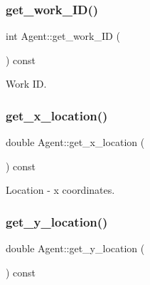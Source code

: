 \mbox{\label{classAgent_a893d27a0906f9578c54fac02c8937e44}} 
\subsubsection{\texorpdfstring{get\+\_\+work\+\_\+\+I\+D()}{get\_work\_ID()}}
{\footnotesize\ttfamily int Agent\+::get\+\_\+work\+\_\+\+ID (\begin{DoxyParamCaption}{ }\end{DoxyParamCaption}) const\hspace{0.3cm}{\ttfamily [inline]}}



Work ID. 

\mbox{\label{classAgent_aa304e2bd2e7a9564bad10c52b16cef09}} 
\subsubsection{\texorpdfstring{get\+\_\+x\+\_\+location()}{get\_x\_location()}}
{\footnotesize\ttfamily double Agent\+::get\+\_\+x\+\_\+location (\begin{DoxyParamCaption}{ }\end{DoxyParamCaption}) const\hspace{0.3cm}{\ttfamily [inline]}}



Location -\/ x coordinates. 

\mbox{\label{classAgent_a6be70e1995c222467a192a90ed9ab7dd}} 
\subsubsection{\texorpdfstring{get\+\_\+y\+\_\+location()}{get\_y\_location()}}
{\footnotesize\ttfamily double Agent\+::get\+\_\+y\+\_\+location (\begin{DoxyParamCaption}{ }\end{DoxyParamCaption}) const\hspace{0.3cm}{\ttfamily [inline]}}



